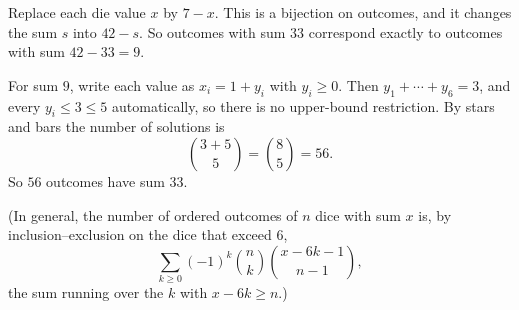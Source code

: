Replace each die value $x$ by $7-x$. This is a bijection on outcomes, and it changes the sum $s$ into $42-s$. So outcomes with sum $33$ correspond exactly to outcomes with sum $42-33=9$.

For sum $9$, write each value as $x_i=1+y_i$ with $y_i\ge0$. Then $y_1+\cdots+y_6=3$, and every $y_i\le3\le5$ automatically, so there is no upper-bound restriction. By stars and bars the number of solutions is
\[
\binom{3+5}{5}=\binom85=56 .
\]
So $\boxed{56}$ outcomes have sum $33$.

(In general, the number of ordered outcomes of $n$ dice with sum $x$ is, by inclusion--exclusion on the dice that exceed $6$,
\[
\sum_{k\ge0}(-1)^k\binom nk\binom{x-6k-1}{n-1},
\]
the sum running over the $k$ with $x-6k\ge n$.)
